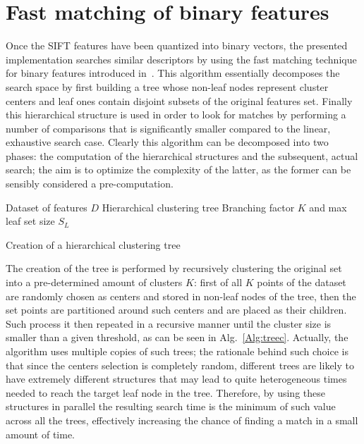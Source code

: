 \documentclass[a4paper, 11pt, oneside]{article}
\begin{document}
    \section*{Fast matching of binary features}
Once the SIFT features have been quantized into binary vectors, the presented implementation searches similar descriptors by using the fast matching technique for binary features introduced in~\cite{muja2012fast}. This algorithm essentially decomposes the search space by first building a tree whose non-leaf nodes represent cluster centers and leaf ones contain disjoint subsets of the original features set. Finally this hierarchical structure is used in order to look for matches by performing a number of comparisons that is significantly smaller compared to the linear, exhaustive search case. Clearly this algorithm can be decomposed into two phases: the computation of the hierarchical structures and the subsequent, actual search; the aim is to optimize the complexity of the latter, as the former can be sensibly considered a pre-computation.

\begin{algorithm}[h!]
\begin{algorithmic}[1]
 \REQUIRE Dataset of features $D$
 \ENSURE Hierarchical clustering tree
 \RETURN Branching factor $K$ and max leaf set size $S_{L}$
 \ELSE 
 \ENDFOR
 \ENDIF
 \end{algorithmic}
 \caption{Creation of a hierarchical clustering tree}\label{Alg:treec}
\end{algorithm}

The creation of the tree is performed by recursively clustering the original set into a pre-determined amount of clusters $K$: first of all $K$ points of the dataset are randomly chosen as centers and stored in non-leaf nodes of the tree, then the set points are partitioned around such centers and are placed as their children. Such process it then repeated in a recursive manner until the cluster size is smaller than a given threshold, as can be seen in Alg.~\ref{Alg:treec}. Actually, the algorithm uses multiple copies of such trees; the rationale behind such choice is that since the centers selection is completely random, different trees are likely to have extremely different structures that may lead to quite heterogeneous times needed to reach the target leaf node in the tree. Therefore, by using these structures in parallel the resulting search time is the minimum of such value across all the trees, effectively increasing the chance of finding a match in a small amount of time.
\end{document}
